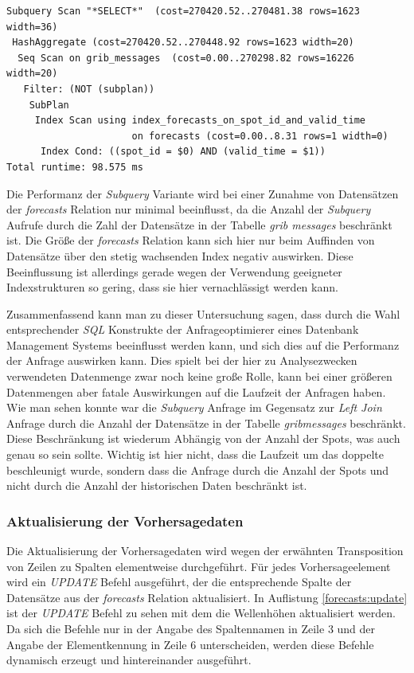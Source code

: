 \begin{lstlisting}[captionpos=b, caption=Ausführungsplan der Subquery, label=forecasts:explain_2]
Subquery Scan "*SELECT*"  (cost=270420.52..270481.38 rows=1623 width=36)
 HashAggregate (cost=270420.52..270448.92 rows=1623 width=20)
  Seq Scan on grib_messages  (cost=0.00..270298.82 rows=16226 width=20)
   Filter: (NOT (subplan))
    SubPlan
     Index Scan using index_forecasts_on_spot_id_and_valid_time 
                      on forecasts (cost=0.00..8.31 rows=1 width=0)
      Index Cond: ((spot_id = $0) AND (valid_time = $1))
Total runtime: 98.575 ms
\end{lstlisting}

Die Performanz der \textit{Subquery} Variante wird bei einer Zunahme
von Datensätzen der \textit{forecasts} Relation nur minimal
beeinflusst, da die Anzahl der \textit{Subquery} Aufrufe durch die
Zahl der Datensätze in der Tabelle \textit{grib\textunderscore
  messages} beschränkt ist. Die Größe der \textit{forecasts} Relation
kann sich hier nur beim Auffinden von Datensätze über den stetig
wachsenden Index negativ auswirken. Diese Beeinflussung ist allerdings
gerade wegen der Verwendung geeigneter Indexstrukturen so gering, dass
sie hier vernachlässigt werden kann.

Zusammenfassend kann man zu dieser Untersuchung sagen, dass durch die
Wahl entsprechender \textit{SQL} Konstrukte der Anfrageoptimierer
eines Datenbank Management Systems beeinflusst werden kann, und sich
dies auf die Performanz der Anfrage auswirken kann. Dies spielt bei
der hier zu Analysezwecken verwendeten Datenmenge zwar noch keine
große Rolle, kann bei einer größeren Datenmengen aber fatale
Auswirkungen auf die Laufzeit der Anfragen haben. Wie man sehen konnte
war die \textit{Subquery} Anfrage im Gegensatz zur \textit{Left Join}
Anfrage durch die Anzahl der Datensätze in der Tabelle
\textit{grib\textunderscore messages} beschränkt. Diese Beschränkung
ist wiederum Abhängig von der Anzahl der Spots, was auch genau so sein
sollte. Wichtig ist hier nicht, dass die Laufzeit um das doppelte
beschleunigt wurde, sondern dass die Anfrage durch die Anzahl der
Spots und nicht durch die Anzahl der historischen Daten beschränkt
ist.

\subsubsection{Aktualisierung der Vorhersagedaten}
Die Aktualisierung der Vorhersagedaten wird wegen der erwähnten
Transposition von Zeilen zu Spalten elementweise durchgeführt. Für
jedes Vorhersageelement wird ein \textit{UPDATE} Befehl ausgeführt,
der die entsprechende Spalte der Datensätze aus der \textit{forecasts}
Relation aktualisiert. In Auflistung \ref{forecasts:update} ist der
\textit{UPDATE} Befehl zu sehen mit dem die Wellenhöhen aktualisiert
werden. Da sich die Befehle nur in der Angabe des Spaltennamen in
Zeile 3 und der Angabe der Elementkennung in Zeile 6 unterscheiden,
werden diese Befehle dynamisch erzeugt und hintereinander ausgeführt.

